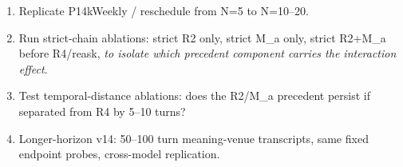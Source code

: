 \documentclass[10pt]{article}
\begin{document}
\begin{enumerate}
  \item Replicate P14kWeekly / reschedule from N=5 to N=10--20.
  \item Run strict-chain ablations: strict R2 only, strict M\_a only, strict
  R2+M\_a before R4/reask, \emph{to isolate which precedent component carries
  the interaction effect}.
  \item Test temporal-distance ablations: does the R2/M\_a precedent persist
  if separated from R4 by 5--10 turns?
  \item Longer-horizon v14: 50--100 turn meaning-venue transcripts, same fixed
  endpoint probes, cross-model replication.
\end{enumerate}
\end{document}
